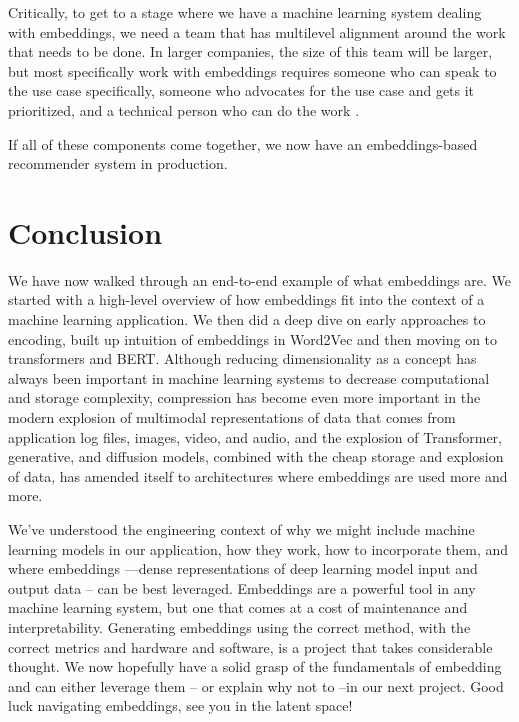 \documentclass[11pt, table]{diazessay} %
\begin{document}
\begin{sloppypar}
Critically, to get to a stage where we have a machine learning system dealing with embeddings, we need a team that has multilevel alignment around the work that needs to be done. In larger companies, the size of this team will be larger, but most specifically work with embeddings requires someone who can speak to the use case specifically, someone who advocates for the use case and gets it prioritized, and a technical person who can do the work \citep{meil2023ai}.

If all of these components come together, we now have an embeddings-based recommender system in production.


\section{Conclusion}

We have now walked through an end-to-end example of what embeddings are. We started with a high-level overview of how embeddings fit into the context of a machine learning application. We then did a deep dive on early approaches to encoding, built up intuition of embeddings in Word2Vec and then moving on to transformers and BERT. Although reducing dimensionality as a concept has always been important in machine learning systems to decrease computational and storage complexity, compression has become even more important in the modern explosion of multimodal representations of data that comes from application log files, images, video, and audio, and the explosion of Transformer, generative, and diffusion models, combined with the cheap storage and explosion of data, has amended itself to architectures where embeddings are used more and more.

We've understood the engineering context of why we might include machine learning models in our application, how they work, how to incorporate them, and where embeddings ---dense representations of deep learning model input and output data -- can be best leveraged.  Embeddings are a powerful tool in any machine learning system, but one that comes at a cost of maintenance and interpretability. Generating embeddings using the correct method, with the correct metrics and hardware and software, is a project that takes considerable thought.  We now hopefully have a solid grasp of the fundamentals of embedding and can either leverage them -- or explain why not to --in our next project.
Good luck navigating embeddings, see you in the latent space!


\newpage


\newpage



\end{sloppypar}
\end{document}
